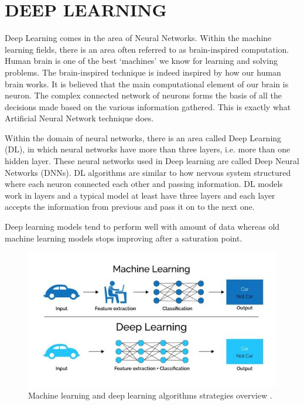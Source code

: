 \documentclass{article}
\begin{document}
\section{DEEP LEARNING}
Deep Learning comes in the area of Neural Networks.
Within the machine learning fields, there is an area often referred to as brain-inspired computation. Human brain is one of the best ‘machines’ we know for learning and solving problems. The brain-inspired technique is indeed inspired by how our human brain works. It is believed that the main computational element of our brain is neuron. The complex connected network of neurons forms the basis of all the decisions made based on the various information gathered. This is exactly what Artificial Neural Network technique does.

Within the domain of neural networks, there is an area called Deep Learning (DL), in which neural networks have more than three layers, i.e. more than one hidden layer. These neural networks used in Deep learning are called Deep Neural Networks (DNNs). DL algorithms are similar to how nervous system structured where each neuron connected each other and passing information. DL models work in layers and a typical model at least have three layers and each layer accepts the information from previous and pass it on to the next one.

Deep learning models tend to perform well with amount of data whereas old machine learning models stops improving after a saturation point.
\begin{figure}[ht]
\centering
\includegraphics[width=1\textwidth]{image4.png}
\caption{Machine learning and deep learning algorithms strategies overview \cite{thakur2021fundamentals}.}
\label{fig: Machine learning and deep learning algorithms.}
\end{figure}
\end{document}
